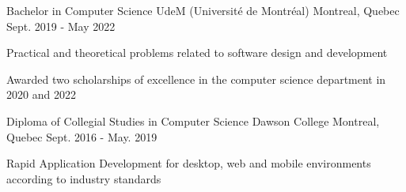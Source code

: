 

\begin{cventries}

  \cventry
    {Bachelor in Computer Science} %
    {UdeM (Université de Montréal)} %
    {Montreal, Quebec} %
    {Sept. 2019 - May 2022} %
    {
      \begin{cvitems} %
        \item {Practical and theoretical problems related to software design and development}
        \item {Awarded two scholarships of excellence in the computer science department in 2020 and 2022}
      \end{cvitems}
    }
  \cventry
    {Diploma of Collegial Studies in Computer Science} %
    {Dawson College} %
    {Montreal, Quebec} %
    {Sept. 2016 - May. 2019} %
    {
      \begin{cvitems} %
        \item {Rapid Application Development for desktop, web and mobile environments according to industry standards}
      \end{cvitems}
    }

\end{cventries}

